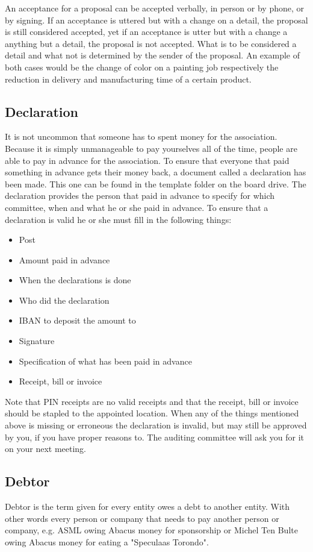 \documentclass{report}
\begin{document}
An acceptance for a proposal can be accepted verbally, in person or by phone, or by signing. If an acceptance is uttered but with a change on a detail, the proposal is still considered accepted, yet if an acceptance is utter but with a change a anything but a detail, the proposal is not accepted. What is to be considered a detail and what not is determined by the sender of the proposal. An example of both cases would be the change of color on a painting job respectively the reduction in delivery and manufacturing time of a certain product.   

\subsection{Declaration}
It is not uncommon that someone has to spent money for the association. Because it is simply unmanageable to pay yourselves all of the time, people are able to pay in advance for the association. To ensure that everyone that paid something in advance gets their money back, a document called a declaration has been made. This one can be found in the template folder on the board drive. The declaration provides the person that paid in advance to specify for which committee, when and what he or she paid in advance. To ensure that a declaration is valid he or she must fill in the following things:
\begin{itemize}
\item Post
\item Amount paid in advance
\item When the declarations is done
\item Who did the declaration
\item IBAN to deposit the amount to
\item Signature
\item Specification of what has been paid in advance
\item Receipt, bill or invoice
\end{itemize}
Note that PIN receipts are no valid receipts and that the receipt, bill or invoice should be stapled to the appointed location. When any of the things mentioned above is missing or erroneous the declaration is invalid, but may still be approved by you, if you have proper reasons to. The auditing committee will ask you for it on your next meeting.  
   
\subsection{Debtor}
Debtor is the term given for every entity owes a debt to another entity. With other words every person or company that needs to pay another person or company, e.g. ASML owing Abacus money for sponsorship or Michel Ten Bulte owing Abacus money for eating a "Speculaas Torondo". 
\end{document}
